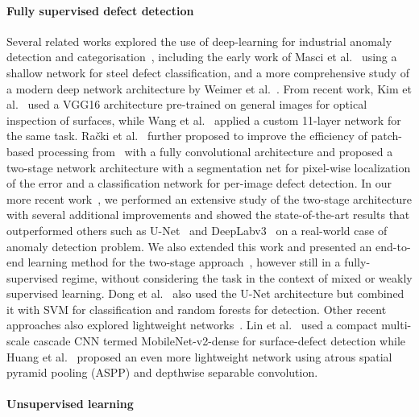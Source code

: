 \paragraph{Fully supervised defect detection} Several related works explored the use of deep-learning for industrial anomaly detection and categorisation~\cite{Onchis2021, Lin2020, Huang2020, Yu2019, Tabernik2019JIM, Racki2018,Lin2018, Wang2018c, Kim2017_DAGM}, including the early work of Masci et al.~\cite{Masci2012} using a shallow network for steel defect classification, and a more comprehensive study of a modern deep network architecture by Weimer et al.~\cite{Weimer2016}. From recent work, Kim et al.~\cite{Kim2017_DAGM} used a VGG16 architecture pre-trained on general images for optical inspection of surfaces, while Wang et al.~\cite{Wang2018c} applied a custom 11-layer network for the same task. Ra\v{c}ki et al.~\cite{Racki2018} further proposed to improve the efficiency of patch-based processing from~\cite{Weimer2016} with a fully convolutional architecture and proposed a two-stage network architecture with a segmentation net for pixel-wise localization of the error and a classification network for per-image defect detection. 
In our more recent work~\cite{Tabernik2019JIM}, we  performed an extensive study of the two-stage architecture with several additional improvements and showed the state-of-the-art results that outperformed others such as U-Net~\cite{Ronneberger2015} and DeepLabv3~\cite{Chen2017} on a real-world case of anomaly detection problem. We also extended this work and presented an end-to-end learning method for the two-stage approach~\cite{bozic2020}, however still in a fully-supervised regime, without considering the task in the context of mixed or weakly supervised learning.
Dong et al.~\cite{Dong2020} also used the U-Net architecture but combined it with SVM for classification and random forests for detection. Other recent approaches also explored lightweight networks~\cite{Yang2020, Lin2020, Huang2020, Liu2020a}. Lin et al.~\cite{Lin2020} used a compact multi-scale cascade CNN termed MobileNet-v2-dense for surface-defect detection while Huang et al.~\cite{Huang2020} proposed an even more lightweight network using atrous spatial pyramid pooling (ASPP) and depthwise separable convolution.

\paragraph{Unsupervised learning}


